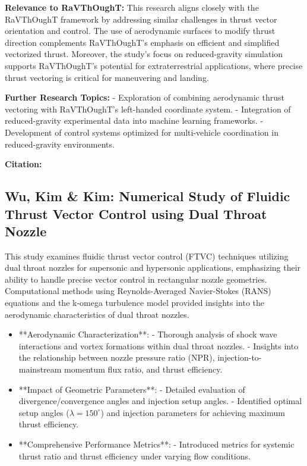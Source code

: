 \textbf{Relevance to RaVThOughT:}
This research aligns closely with the RaVThOughT framework by addressing similar challenges in thrust vector orientation and control. The use of aerodynamic surfaces to modify thrust direction complements RaVThOughT's emphasis on efficient and simplified vectorized thrust. Moreover, the study's focus on reduced-gravity simulation supports RaVThOughT's potential for extraterrestrial applications, where precise thrust vectoring is critical for maneuvering and landing.

\textbf{Further Research Topics:}
- Exploration of combining aerodynamic thrust vectoring with RaVThOughT’s left-handed coordinate system.
- Integration of reduced-gravity experimental data into machine learning frameworks.
- Development of control systems optimized for multi-vehicle coordination in reduced-gravity environments.

\textbf{Citation:} 

\subsection{Wu, Kim \& Kim: Numerical Study of Fluidic Thrust Vector Control using Dual Throat Nozzle}

This study examines fluidic thrust vector control (FTVC) techniques utilizing dual throat nozzles for supersonic and hypersonic applications, emphasizing their ability to handle precise vector control in rectangular nozzle geometries. Computational methods using Reynolds-Averaged Navier-Stokes (RANS) equations and the k-omega turbulence model provided insights into the aerodynamic characteristics of dual throat nozzles.

\begin{itemize}
  \item **Aerodynamic Characterization**:
  - Thorough analysis of shock wave interactions and vortex formations within dual throat nozzles.
  - Insights into the relationship between nozzle pressure ratio (NPR), injection-to-mainstream momentum flux ratio, and thrust efficiency.

  \item **Impact of Geometric Parameters**:
  - Detailed evaluation of divergence/convergence angles and injection setup angles.
  - Identified optimal setup angles (\( \lambda = 150^\circ \)) and injection parameters for achieving maximum thrust efficiency.

  \item **Comprehensive Performance Metrics**:
  - Introduced metrics for systemic thrust ratio and thrust efficiency under varying flow conditions.
\end{itemize}

